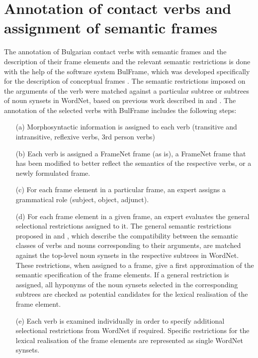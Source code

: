 \documentclass[output=paper,colorlinks,citecolor=brown]{langscibook}
\begin{document}
\section{Annotation of contact verbs and assignment of semantic frames}\label{ch5:sec:3}
The annotation of Bulgarian contact verbs with semantic frames and the description of their frame elements and the relevant semantic restrictions is done with the help of the software system BulFrame, which was developed specifically for the description of conceptual frames \citep{KoevaDoychev:2022}. The semantic restrictions imposed on the arguments of the verb were matched against a particular subtree or subtrees of noun synsets in WordNet, based on previous work described in \citet{Leseva:18} and \citet{DimitrovaStefanova2019}. The annotation of the selected verbs with BulFrame includes the following steps:

\begin{itemize}
\item[(a)] Morphosyntactic information is assigned to each verb (transitive and intransitive, reflexive verbs, 3rd person verbs)

\item[(b)] Each verb is assigned a FrameNet frame (as is), a FrameNet frame that has been modified to better reflect the semantics of the respective verbs, or a newly formulated frame.

\item[(c)] For each frame element in a particular frame, an expert assigns a grammatical role (subject, object, adjunct).

\item[(d)] For each frame element in a given frame, an expert evaluates the general selectional restrictions assigned to it. The general semantic restrictions proposed in \citet{Lesevaetal:2019} and \citet{DimitrovaStefanova2019}, which describe the compatibility between the semantic classes of verbs and nouns corresponding to their arguments, are matched against the top-level noun synsets in the respective subtrees in WordNet. These restrictions, when assigned to a frame, give a first approximation of the semantic specification of the frame elements. If a general restriction is assigned, all hyponyms of the noun synsets selected in the corresponding subtrees are checked as potential candidates for the lexical realisation of the frame element.

\item[(e)] Each verb is examined individually in order to specify additional selectional restrictions from WordNet if required. Specific restrictions for the lexical realisation of the frame elements are represented as single WordNet synsets.
\end{itemize}
\end{document}
